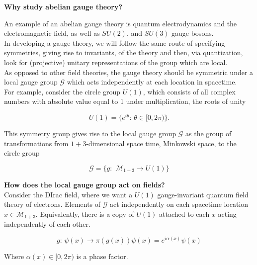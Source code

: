 
\noindent \textbf{Why study abelian gauge theory?}

\noindent An example of an abelian gauge theory is quantum electrodynamics and the electromagnetic field, as well as $SU(2)$, and $SU(3)$ gauge bosons. \\

\noindent In developing a gauge theory, we will follow the same route of specifying symmetries, giving rise to invariants, of the theory and then, via quantization, look for (projective) unitary representations of the group which are local. \\

\noindent As opposed to other field theories, the gauge theory should be symmetric under a local gauge group $\mathcal{G}$ which acts independently at each location in spacetime. \\

\noindent For example, consider the circle group $U(1)$, which consists of all complex numbers with absolute value equal to 1 under multiplication, the roots of unity

\begin{equation}
U(1) = \{ e^{i \theta} : \, \theta \in [0, 2 \pi ) \}.
\end{equation}

\noindent This symmetry group gives rise to the local gauge group $\mathcal{G}$ as the group of transformations from $1+3$-dimensional space time, Minkowski space, to the circle group

\begin{equation}
\mathcal{G} = \{ g: \,\, \mathcal{M}_{1+3} \rightarrow U(1) \}
\end{equation}

\noindent \textbf{How does the local gauge group act on fields? }\\

\noindent Consider the DIrac field, where we want a $U(1)$ gauge-invariant quantum field theory of electrons. Elements of $\mathcal{G}$ act independently on each spacetime location$x \in \mathcal{M}_{1+3}$. Equivalently, there is a copy of $U(1)$ attached to each $x$ acting independently of each other.

\begin{equation}
g: \, \psi (x) \rightarrow \pi ( g (x) ) \psi(x) = e^{i \alpha (x)} \psi (x)
\end{equation}

\noindent Where $\alpha(x) \in [ 0 , 2 \pi )$ is a phase factor. \\


